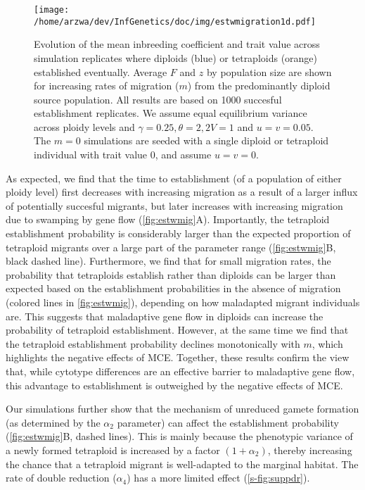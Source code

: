 \documentclass[12pt,a4paper]{article}
\begin{document}
\begin{figure}[t]
\centering
\texttt{[image: /home/arzwa/dev/InfGenetics/doc/img/estwmigration1d.pdf]}
\caption{
    Evolution of the mean inbreeding coefficient and trait value across
    simulation replicates where diploids (blue) or tetraploids (orange)
    established eventually.
    Average $F$ and $z$ by population size are shown for increasing rates
    of migration ($m$) from the predominantly diploid source population. 
    All results are based on 1000 succesful establishment replicates.
    We assume equal equilibrium variance across ploidy levels and $\gamma=0.25,
    \theta=2, 2V=1$ and $u=v=0.05$.
    The $m=0$ simulations are seeded with a single diploid or tetraploid
    individual with trait value 0, and assume $u=v=0$.
\label{fig:estwmig2}}
\end{figure}

As expected, we find that the time to establishment (of a population of either
ploidy level) first decreases with increasing migration as a result of a larger
influx of potentially succesful migrants, but later increases with increasing
migration due to swamping by gene flow (\cref{fig:estwmig}A).
Importantly, the tetraploid establishment probability is considerably larger
than the expected proportion of tetraploid migrants over a large part of the
parameter range (\cref{fig:estwmig}B, black dashed line).
Furthermore, we find that for small migration rates, the probability that
tetraploids establish rather than diploids can be larger than expected based on
the establishment probabilities in the absence of migration (colored lines in
\cref{fig:estwmig}), depending on how maladapted migrant individuals are.
This suggests that maladaptive gene flow in diploids can increase the
probability of tetraploid establishment.
However, at the same time we find that the tetraploid establishment probability
declines monotonically with $m$, which highlights the negative effects of MCE.
Together, these results confirm the view that, while cytotype differences are an
effective barrier to maladaptive gene flow, this advantage to establishment is
outweighed by the negative effects of MCE.

Our simulations further show that the mechanism of unreduced gamete formation
(as determined by the $\alpha_2$ parameter) can affect the establishment
probability (\cref{fig:estwmig}B, dashed lines).
This is mainly because the phenotypic variance of a newly formed tetraploid is
increased by a factor $(1+\alpha_2)$, thereby increasing the chance that a
tetraploid migrant is well-adapted to the marginal habitat.
The rate of double reduction ($\alpha_4$) has a more limited effect
(\cref{s-fig:suppdr}).
\end{document}
